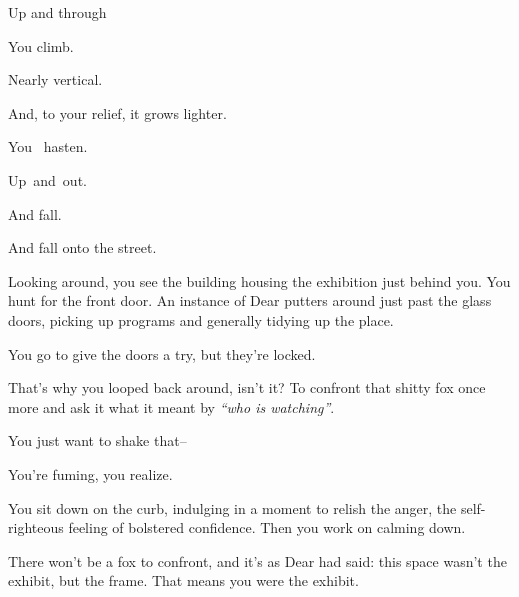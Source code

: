 Up and through

\null
\vfill

\newpage

\newpage

\null
\vspace{2in}

You climb.

\newpage

\null
\vspace{1.5in}

Nearly vertical.

\newpage

\null
\vspace{1in}

And, to your relief, it grows lighter.

\newpage

\null
\vspace{0.5in}

You {\large\ hasten.}

\newpage

{\large Up}{\Large\ and}{\LARGE\ out.}

\newpage

\null
\vfill

\begin{flushright}
  \footnotesize
  And fall.\hspace{1cm}\null
\end{flushright}


\newpage

And fall onto the street.

Looking around, you see the building housing the exhibition just behind you. You hunt for the front door. An instance of Dear putters around just past the glass doors, picking up programs and generally tidying up the place.

You go to give the doors a try, but they're locked.

That's why you looped back around, isn't it? To confront that shitty fox once more and ask it what it meant by \emph{``who is watching''}.

You just want to shake that--

You're fuming, you realize.

You sit down on the curb, indulging in a moment to relish the anger, the self-righteous feeling of bolstered confidence. Then you work on calming down.

There won't be a fox to confront, and it's as Dear had said: this space wasn't the exhibit, but the frame. That means you were the exhibit.

